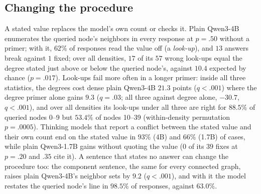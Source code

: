 \documentclass[11pt]{article}
\begin{document}
\subsection{Changing the procedure}
A stated value replaces the model's own count or checks it. Plain Qwen3-4B enumerates the queried node's neighbors in every response at $p=.50$ without a primer; with it, $62\%$ of responses read the value off (a \emph{look-up}), %
and $13$ answers break against $1$ fixed; %
over all densities, $17$ of its $57$ wrong look-ups equal the degree stated just above or below the queried node's, against $10.4$ expected by chance ($p=.017$). %
Look-ups fail more often in a longer primer: inside all three statistics, the degrees cost dense plain Qwen3-4B $21.3$ points ($q<.001$) where the degree primer alone gains $9.3$ ($q=.03$; all three against degree alone, $-30.7$, $q<.001$), %
and over all densities its look-ups under all three are right for $88.5\%$ of queried nodes 0--9 but $53.4\%$ of nodes 10--39 (within-density permutation $p=.0005$). %
Thinking models that report a conflict between the stated value and their own count end on the stated value in $93\%$ (4B) and $66\%$ (1.7B) of cases, %
while plain Qwen3-1.7B gains without quoting the value ($0$ of its $39$ fixes at $p=.20$ and $.35$ cite it). %
A sentence that states no answer can change the procedure too: the component sentence, the same for every connected graph, raises plain Qwen3-4B's neighbor sets by $9.2$ ($q<.001$), and with it the model restates the queried node's line in $98.5\%$ of responses, against $63.0\%$. %
\end{document}
